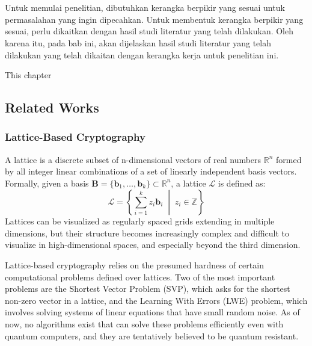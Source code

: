 \chapter{\babDua}
\label{bab:2}

Untuk memulai penelitian, dibutuhkan kerangka berpikir yang sesuai untuk permasalahan yang ingin dipecahkan.
Untuk membentuk kerangka berpikir yang sesuai, perlu dikaitkan dengan hasil studi literatur yang telah dilakukan.
Oleh karena itu, pada bab ini, akan dijelaskan hasil studi literatur yang telah dilakukan yang telah dikaitan dengan kerangka kerja untuk penelitian ini.

This chapter


\section{Related Works}
\label{sec:Related Works}
\subsection{Lattice-Based Cryptography}
A lattice is a discrete subset of n-dimensional vectors of real numbers $\mathbb{R}^n$ formed by all integer linear combinations of a set of linearly independent basis vectors. Formally, given a basis $\mathbf{B} = \{ \mathbf{b}_1, \dots, \mathbf{b}_k \} \subset \mathbb{R}^n$, a lattice $\mathcal{L}$ is defined as:
\[
\mathcal{L} = \left\{ \sum_{i=1}^{k} z_i \mathbf{b}_i \;\middle|\; z_i \in \mathbb{Z} \right\}
\]
Lattices can be visualized as regularly spaced grids extending in multiple dimensions, but their structure becomes increasingly complex and difficult to visualize in high-dimensional spaces, and especially beyond the third dimension.

Lattice-based cryptography relies on the presumed hardness of certain computational problems defined over lattices. Two of the most important problems are the Shortest Vector Problem (SVP), which asks for the shortest non-zero vector in a lattice, and the Learning With Errors (LWE) problem, which involves solving systems of linear equations that have small random noise. As of now, no algorithms exist that can solve these problems efficiently even with quantum computers, and they are tentatively believed to be quantum resistant.

